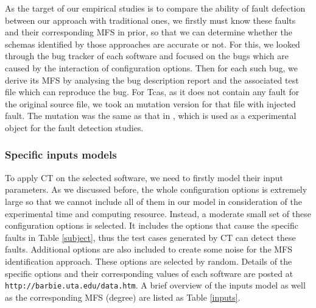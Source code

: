 \documentclass{sig-alternate}
\begin{document}
As the target of our empirical studies is to compare the ability of fault defection between our approach with traditional ones, we firstly must know these faults and their corresponding MFS in prior, so that we can determine whether the schemas identified by those approaches are accurate or not.  For this, we looked through the bug tracker of each software and focused on the bugs which are caused by the interaction of configuration options. Then for each such bug, we derive its MFS by analysing the bug description report and the associated test file which can reproduce the bug. For Tcas, as it does not contain any fault for the original source file, we took an mutation version for that file with injected fault. The mutation was the same as that in \cite{kuhn2006pseudo}, which is used as a experimental object for the fault detection studies.



\subsubsection{Specific inputs models}
To apply CT on the selected software, we need to firstly model their input parameters. As we discussed before, the whole configuration options is extremely large so that we cannot include all of them in our model in consideration of the experimental time and computing resource. Instead, a moderate small set of these configuration options is selected.  It includes the options that cause the specific faults in Table \ref{subject}, thus the test cases generated by CT can detect these faults. Additional options are also included to create some noise for the MFS identification approach. These options are selected by random. Details of the specific options and their corresponding values of each software are posted at \texttt{http://barbie.uta.edu/data.htm}.  A brief overview of the inputs model as well as the corresponding MFS (degree) are listed as Table \ref{inputs}.

\end{document}
